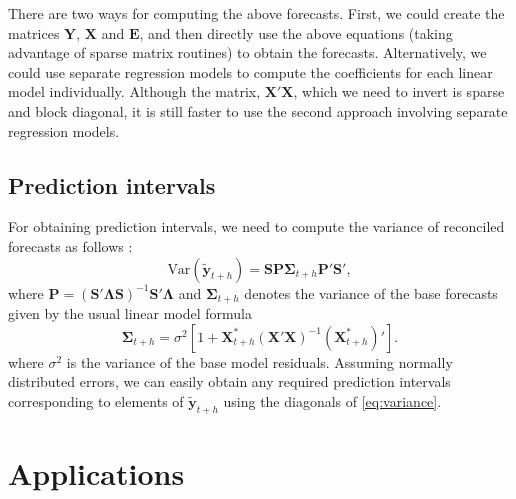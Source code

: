 \documentclass[11pt,a4paper,]{article}
\begin{document}
There are two ways for computing the above forecasts. First, we could create the matrices \(\bm{Y}\), \(\bm{X}\) and \(\bm{E}\), and then directly use the above equations (taking advantage of sparse matrix routines) to obtain the forecasts. Alternatively, we could use separate regression models to compute the coefficients for each linear model individually. Although the matrix, \(\bm{X}'\bm{X}\), which we need to invert is sparse and block diagonal, it is still faster to use the second approach involving separate regression models.

\hypertarget{prediction-intervals}{%
\subsection{Prediction intervals}\label{prediction-intervals}}

For obtaining prediction intervals, we need to compute the variance of reconciled forecasts as follows \autocite{mint2018}:
\begin{equation}\label{eq:variance}
    \text{Var}(\tilde{\bm{y}}_{t+h})
        = \bm{S}\bm{P}{\bm{\Sigma}_{t+h}} \bm{P}'\bm{S}',
\end{equation}
where \(\bm{P} = (\bm{S}'\bm{\Lambda}\bm{S})^{-1}\bm{S}'\bm{\Lambda}\) and \({\bm{\Sigma}_{t+h}}\) denotes the variance of the base forecasts given by the usual linear model formula \autocite{fpp2}
\begin{equation}\label{eq:recvariance}
  \bm{\Sigma}_{t+h} = \sigma^2\left[1 + \bm{X}_{t+h}^*(\bm{X}'\bm{X})^{-1}(\bm{X}_{t+h}^*)'\right].
\end{equation}
where \(\sigma^2\) is the variance of the base model residuals. Assuming normally distributed errors, we can easily obtain any required prediction intervals corresponding to elements of \(\tilde{\bm{y}}_{t+h}\) using the diagonals of \eqref{eq:variance}.

\hypertarget{applications}{%
\section{Applications}\label{applications}}
\end{document}
